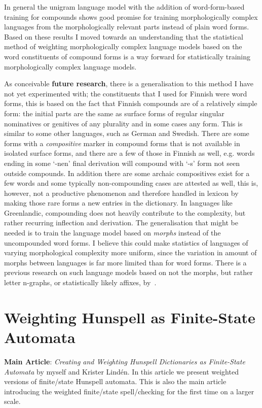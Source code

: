 \documentclass[officiallayout,final]{unihelcompling}
\begin{document}
In general the unigram language model with the addition of word-form-based
training for compounds shows good promise for training
morphologically complex languages from the morphologically relevant parts
instead of plain word forms. Based on these results I moved towards an 
understanding that the statistical method of weighting morphologically complex
language models based on the word constituents of compound forms is a way 
forward for statistically training morphologically complex language models.

As conceivable \textbf{future research}, there is a generalisation to this
method I have not yet experimented with; the constituents that I used for
Finnish were word forms, this is based on the fact that Finnish compounds are
of a relatively simple form: the initial parts are the same as surface forms of
regular singular nominatives or genitives of any plurality and in some cases
any form. This is similar to some other languages, such as German and Swedish.
There are some forms with a \emph{compositive} marker in compound forms that is
not available in isolated surface forms, and there are a few of those in
Finnish as well, e.g.\/ words ending in some `-nen' final derivation will
compound with `-s' form not seen outside compounds. In addition there
are some archaic compositives exist for a few words and some typically 
non-compounding cases are attested as well, this is, however, not a productive
phenomenon and therefore handled in lexicon by making those rare forms a new
entries in the dictionary.  In languages like Greenlandic, compounding
does not heavily contribute to the complexity, but rather recurring inflection
and derivation. The generalisation that might be needed is to train the
language model based on \emph{morphs} instead of the uncompounded word forms.
I believe this could make statistics of languages of varying morphological
complexity more uniform, since the variation in amount of morphs between
languages is far more limited than for word forms. There is a previous research
on such language models based on not the morphs, but rather letter n-graphs, or
statistically likely affixes, by~\citet{creutz2005morfessor}.


\section{Weighting Hunspell as Finite-State Automata}
\label{sec:hunspell-training}

\textbf{Main Article}: \emph{Creating and Weighting Hunspell Dictionaries as
Finite-State Automata} by myself and Krister Lindén. In this article we present
weighted versions of finite\-/state Hunspell automata. This is also the main
article introducing the weighted finite\-/state spell\-/checking for the first time
on a larger scale.
\end{document}

